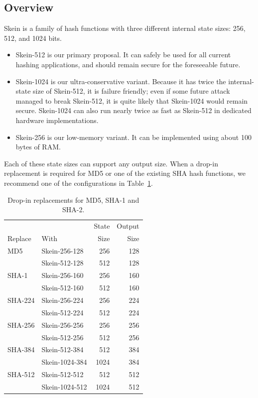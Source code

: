 \documentclass[11pt,twoside]{article}
\begin{document}
\subsection{Overview}

Skein is a family of hash functions with three different internal state sizes: 256, 512, and 1024 bits.

\begin{itemize}
\item Skein-512 is our primary proposal.  It can safely be used for all current hashing applications, and should remain secure for the foreseeable future.

\item Skein-1024 is our ultra-conservative variant.  Because it has twice the internal-state size of Skein-512, it is failure friendly; even if some future attack managed to break Skein-512, it is quite likely that Skein-1024 would remain secure.  Skein-1024 can also run nearly twice as fast as Skein-512 in dedicated hardware implementations.

\item Skein-256 is our low-memory variant.  It can be implemented using about 100 bytes of RAM.
\end{itemize}

Each of these state sizes can support any output size.  When a drop-in replacement is required for MD5 or one of the existing SHA hash functions, we recommend one of the configurations in Table~\ref{tab:versions}.
%
\begin{table}
  \begin{center}
    \begin{tabular}{|llrr|}
    \hline
    & & State & Output \\
    Replace & With & Size & Size \\
    \hline
    MD5 & Skein-256-128 & 256 & 128\\
        & Skein-512-128 & 512 & 128 \\
    \hline
    SHA-1 & Skein-256-160 & 256 & 160 \\
          & Skein-512-160 & 512 & 160 \\
    \hline
    SHA-224 & Skein-256-224 & 256 & 224 \\
            & Skein-512-224 & 512 & 224 \\
    \hline
    SHA-256 & Skein-256-256 & 256 & 256 \\
            & Skein-512-256 & 512 & 256 \\
    \hline
    SHA-384 & Skein-512-384 & 512 & 384 \\
            & Skein-1024-384 & 1024 & 384 \\
    \hline
    SHA-512 & Skein-512-512 & 512 & 512 \\
            & Skein-1024-512 & 1024 & 512 \\
    \hline
    \end{tabular}
  \end{center}\caption{Drop-in replacements for MD5, SHA-1 and SHA-2.}
  \label{tab:versions}
\end{table}
\end{document}
